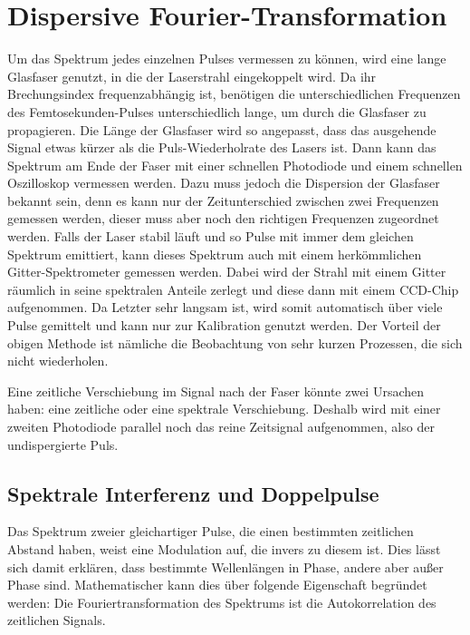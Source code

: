 \documentclass[bachelor,       %
               twoside,        %
               BCOR10mm,       %
               liststotoc,nomtotoc,bibtotoc, %
               english,ngerman, %
               final,          %
               ]{GAUBM}
\begin{document}
\section{Dispersive Fourier-Transformation}
Um das Spektrum jedes einzelnen Pulses vermessen zu können, wird eine lange Glasfaser genutzt, in die der Laserstrahl eingekoppelt wird.
Da ihr Brechungsindex frequenzabhängig ist, benötigen die unterschiedlichen Frequenzen des Femtosekunden-Pulses unterschiedlich lange, um durch die Glasfaser zu propagieren.
Die Länge der Glasfaser wird so angepasst, dass das ausgehende Signal etwas kürzer als die Puls-Wiederholrate des Lasers ist.
Dann kann das Spektrum am Ende der Faser mit einer schnellen Photodiode und einem schnellen Oszilloskop vermessen werden.
Dazu muss jedoch die Dispersion der Glasfaser bekannt sein, denn es kann nur der Zeitunterschied zwischen zwei Frequenzen gemessen werden, dieser muss aber noch den richtigen Frequenzen zugeordnet werden.
Falls der Laser stabil läuft und so Pulse mit immer dem gleichen Spektrum emittiert, kann dieses Spektrum auch mit einem herkömmlichen Gitter-Spektrometer gemessen werden.
Dabei wird der Strahl mit einem Gitter räumlich in seine spektralen Anteile zerlegt und diese dann mit einem CCD-Chip aufgenommen.
Da Letzter sehr langsam ist, wird somit automatisch über viele Pulse gemittelt und kann nur zur Kalibration genutzt werden.
Der Vorteil der obigen Methode ist nämliche die Beobachtung von sehr kurzen Prozessen, die sich nicht wiederholen.

Eine zeitliche Verschiebung im Signal nach der Faser könnte zwei Ursachen haben: eine zeitliche oder eine spektrale Verschiebung.
Deshalb wird mit einer zweiten Photodiode parallel noch das reine Zeitsignal aufgenommen, also der undispergierte Puls.

\subsection{Spektrale Interferenz und Doppelpulse}
Das Spektrum zweier gleichartiger Pulse, die einen bestimmten zeitlichen Abstand haben, weist eine Modulation auf, die invers zu diesem ist.
Dies lässt sich damit erklären, dass bestimmte Wellenlängen in Phase, andere aber außer Phase sind.
Mathematischer kann dies über folgende Eigenschaft begründet werden:
Die Fouriertransformation des Spektrums ist die Autokorrelation des zeitlichen Signals.
\end{document}
